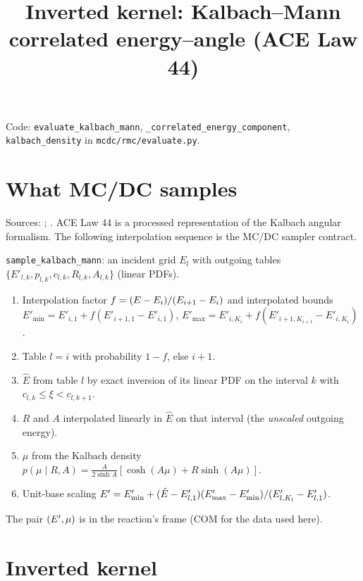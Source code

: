 \documentclass[11pt]{article}
\title{Inverted kernel: Kalbach--Mann correlated energy--angle (ACE Law 44)}
\date{}
\begin{document}
\maketitle

\noindent Code: \texttt{evaluate\_kalbach\_mann},
\texttt{\_correlated\_energy\_component}, \texttt{kalbach\_density} in
\texttt{mcdc/rmc/evaluate.py}.

\section{What MC/DC samples}

\noindent Sources: ; . ACE Law 44 is a processed representation of the Kalbach angular
formalism. The following interpolation sequence is the MC/DC sampler contract.

\texttt{sample\_kalbach\_mann}: an incident grid $E_l$ with outgoing tables
$\{E'_{l,k}, p_{l,k}, c_{l,k}, R_{l,k}, A_{l,k}\}$ (linear PDFs).
\begin{enumerate}
  \item Interpolation factor $f = (E - E_i)/(E_{i+1} - E_i)$ and interpolated bounds
  $E'_{\min} = E'_{i,1} + f(E'_{i+1,1} - E'_{i,1})$,
  $E'_{\max} = E'_{i,K_i} + f(E'_{i+1,K_{i+1}} - E'_{i,K_i})$.
  \item Table $l = i$ with probability $1-f$, else $i+1$.
  \item $\hat E$ from table $l$ by exact inversion of its linear PDF on the interval
  $k$ with $c_{l,k} \le \xi < c_{l,k+1}$.
  \item $R$ and $A$ interpolated linearly in $\hat E$ on that interval (the
  \emph{unscaled} outgoing energy).
  \item $\mu$ from the Kalbach density
  $p(\mu \mid R, A) = \frac{A}{2\sinh A}\left[\cosh(A\mu) + R\sinh(A\mu)\right]$.
  \item Unit-base scaling $E' = E'_{\min} + (\hat E - E'_{l,1})
  (E'_{\max} - E'_{\min})/(E'_{l,K_l} - E'_{l,1})$.
\end{enumerate}
The pair $(E', \mu)$ is in the reaction's frame (COM for the data used here).

\section{Inverted kernel}
\end{document}
